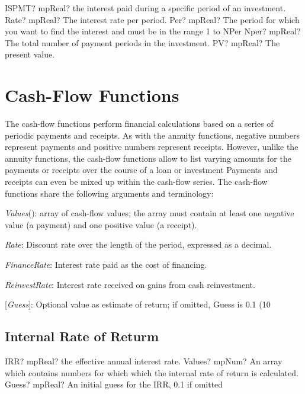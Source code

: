 \begin{mpFunctionsExtract}
	\mpWorksheetFunctionFourNotImplemented
	{ISPMT? mpReal?  the interest paid during a specific period of an investment.}
	{Rate? mpReal? The interest rate per period.}
	{Per? mpReal? The period for which you want to find the interest and must be in the range 1 to NPer}
	{Nper? mpReal? The total number of payment periods in the investment.}
	{PV? mpReal? The present value.}
\end{mpFunctionsExtract}




\newpage
\section{Cash-Flow Functions}
\label{CashFlow Functions}
The cash-flow functions perform financial calculations based on a series of periodic payments and receipts. As with the annuity functions, negative numbers represent payments and positive numbers represent receipts. However, unlike the annuity functions, the cash-flow functions allow to list varying amounts for the payments or receipts over the course of a loan or investment Payments and receipts can even be mixed up within the cash-flow series. The cash-flow functions share the following arguments and terminology:

\textit{Values}(): array of cash-flow values; the array must contain at least one negative value (a payment) and one positive value (a receipt).

\textit{Rate}: Discount rate over the length of the period, expressed as a decimal.

\textit{FinanceRate}: Interest rate paid as the cost of financing.

\textit{ReinvestRate}: Interest rate received on gains from cash reinvestment.

[\textit{Guess}]: Optional value as estimate of return; if omitted, Guess is 0.1 (10%


\subsection{Internal Rate of Returm}

\begin{mpFunctionsExtract}
	\mpWorksheetFunctionTwoNotImplemented
	{IRR? mpReal? the effective annual interest rate.}
	{Values? mpNum? An array which contains numbers for which which the internal rate of return is calculated.}
	{Guess? mpReal? An initial guess for the IRR, 0.1 if omitted}
\end{mpFunctionsExtract}

